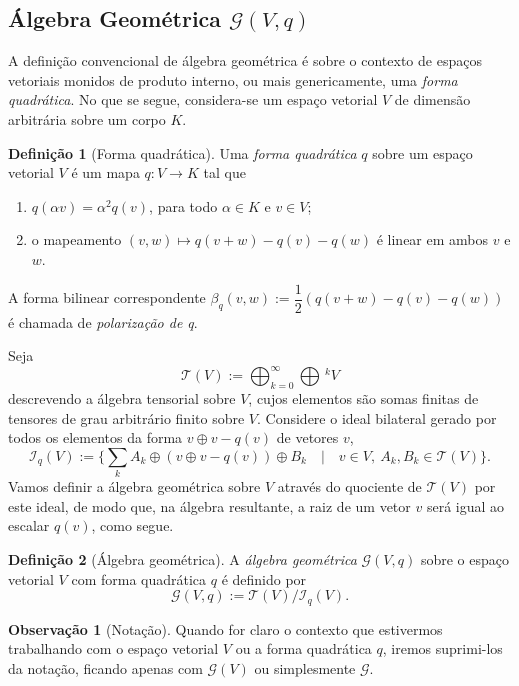 \documentclass[a4paper,12pt]{report}
\theoremstyle{plain}
\theoremstyle{definition}
\newtheorem{definicao}{Definição}[section]
\newtheorem{observacao}{Observação}[section]
\begin{document}
	\subsection{Álgebra Geométrica $\mathcal G(V,q)$}
	A definição convencional de álgebra geométrica é sobre o contexto de espaços vetoriais monidos de produto interno, ou mais genericamente, uma \textit{forma quadrática}. No que se segue, considera-se um espaço vetorial $V$ de dimensão arbitrária sobre um corpo $K$.
	
	\begin{definicao}[Forma quadrática]
	Uma \textit{forma quadrática} $q$ sobre um espaço vetorial $V$ é um mapa $q: V\longrightarrow K$ tal que	
	\begin{enumerate}
		\item $q(\alpha v) = \alpha^2q(v)$, para todo $\alpha\in K$ e $v\in V$; 
		\item o mapeamento $(v,w) \mapsto q(v+w) -q(v)-q(w)$ é linear em ambos $v$ e $w$.
	\end{enumerate}
	A forma bilinear correspondente $\beta_q(v,w):= \dfrac 1 2 (q(v+w)-q(v)-q(w))$ é chamada de \textit{polarização de q}.
	\end{definicao}
	
	Seja $$\mathcal{T}(V) := \bigoplus^\infty_{k=0}\bigoplus\, ^kV$$ descrevendo a álgebra tensorial sobre $V$, cujos elementos são somas finitas de tensores de grau arbitrário finito sobre $V$. Considere o ideal bilateral gerado por todos os elementos da forma $v\oplus v-q(v)$ de vetores $v$,
	$$\mathcal{I}_q(V) := \{\sum_k A_k\oplus(v\oplus v-q(v))\oplus B_k \quad | \quad v\in V, \ A_k,B_k \in \mathcal{T}(V)\}.$$
	Vamos definir a álgebra geométrica sobre $V$ através do quociente de $\mathcal{T}(V)$ por este ideal, de modo que, na álgebra resultante, a raiz de um vetor $v$ será igual ao escalar $q(v)$, como segue.
	
	\begin{definicao}[Álgebra geométrica]
		A \textit{álgebra geométrica} $\mathcal{G}(V,q)$ sobre o espaço vetorial $V$ com forma quadrática $q$ é definido por $$\mathcal{G}(V,q) := \mathcal{T}(V)/\mathcal{I}_q(V).$$
	\end{definicao}
	
	\begin{observacao}[Notação]
		Quando for claro o contexto que estivermos trabalhando com o espaço vetorial $V$ ou a forma quadrática $q$, iremos suprimi-los da notação, ficando apenas com $\mathcal{G}(V)$ ou simplesmente $\mathcal{G}$.
	\end{observacao}
	
\end{document}
